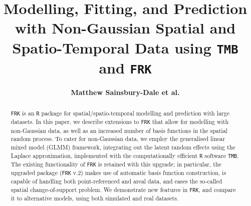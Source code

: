 \documentclass[12pt,a4paper]{article}
\begin{document}

\title{\textbf{Modelling, Fitting, and Prediction with Non-Gaussian Spatial and Spatio-Temporal Data using \texttt{TMB} and \texttt{FRK}}}

\author[1]{\textbf{Matthew Sainsbury-Dale et al.}}


\date{}


\maketitle

\begin{abstract}
\onehalfspacing

\texttt{FRK} is an \texttt{R} package for spatial/spatio-temporal modelling and prediction with large datasets. 
In this paper, we describe extensions to \texttt{FRK} that allow for modelling with non-Gaussian data, as well as an increased number of basis functions in the spatial random process. 
To cater for non-Gaussian data, we employ the generalised linear mixed model (GLMM) framework, integrating out the latent random effects using the Laplace approximation, implemented with the computationally efficient \texttt{R} software \texttt{TMB}. 
The existing functionality of \texttt{FRK} is retained with this upgrade; in particular, the upgraded package (\texttt{FRK} v.2) makes use of automatic basis function construction, is capable of handling both point-referenced and areal data, and eases the so-called spatial change-of-support problem. 
We demonstrate new features in \texttt{FRK}, and compare it to alternative models, using both simulated and real datasets. 
\end{abstract}
\end{document}
